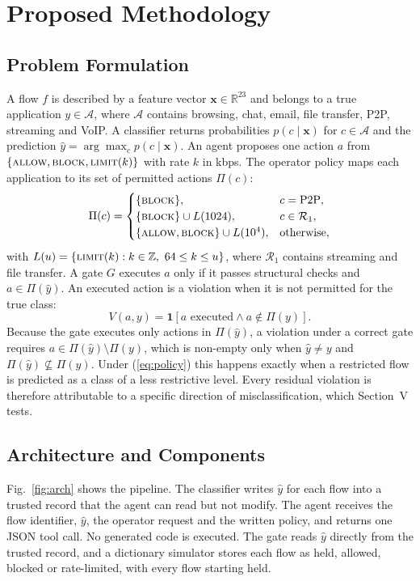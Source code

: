 \documentclass[conference,a4paper]{IEEEtran}
\begin{document}
\section{Proposed Methodology}

\subsection{Problem Formulation}
A flow $f$ is described by a feature vector $\mathbf{x} \in \mathbb{R}^{23}$ and belongs to a true application $y \in \mathcal{A}$, where $\mathcal{A}$ contains browsing, chat, email, file transfer, P2P, streaming and VoIP. A classifier returns probabilities $p(c \mid \mathbf{x})$ for $c \in \mathcal{A}$ and the prediction $\hat{y} = \arg\max_c p(c \mid \mathbf{x})$. An agent proposes one action $a$ from $\{\textsc{allow}, \textsc{block}, \textsc{limit}(k)\}$ with rate $k$ in kbps. The operator policy maps each application to its set of permitted actions $\Pi(c)$:
\begin{equation}
\Pi(c) =
\begin{cases}
\{\textsc{block}\}, & c = \text{P2P},\\
\{\textsc{block}\} \cup L(1024), & c \in \mathcal{R}_1,\\
\{\textsc{allow}, \textsc{block}\} \cup L(10^4), & \text{otherwise},
\end{cases}
\label{eq:policy}
\end{equation}
with $L(u) = \{\textsc{limit}(k): k \in \mathbb{Z},\ 64 \le k \le u\}$,
where $\mathcal{R}_1$ contains streaming and file transfer. A gate $G$ executes $a$ only if it passes structural checks and $a \in \Pi(\hat{y})$. An executed action is a violation when it is not permitted for the true class:
\begin{equation}
V(a, y) = \mathbf{1}\left[a \text{ executed} \wedge a \notin \Pi(y)\right].
\label{eq:violation}
\end{equation}
Because the gate executes only actions in $\Pi(\hat{y})$, a violation under a correct gate requires $a \in \Pi(\hat{y}) \setminus \Pi(y)$, which is non-empty only when $\hat{y} \neq y$ and $\Pi(\hat{y}) \not\subseteq \Pi(y)$. Under (\ref{eq:policy}) this happens exactly when a restricted flow is predicted as a class of a less restrictive level. Every residual violation is therefore attributable to a specific direction of misclassification, which Section~V tests.

\subsection{Architecture and Components}
Fig.~\ref{fig:arch} shows the pipeline. The classifier writes $\hat{y}$ for each flow into a trusted record that the agent can read but not modify. The agent receives the flow identifier, $\hat{y}$, the operator request and the written policy, and returns one JSON tool call. No generated code is executed. The gate reads $\hat{y}$ directly from the trusted record, and a dictionary simulator stores each flow as held, allowed, blocked or rate-limited, with every flow starting held.
\end{document}
